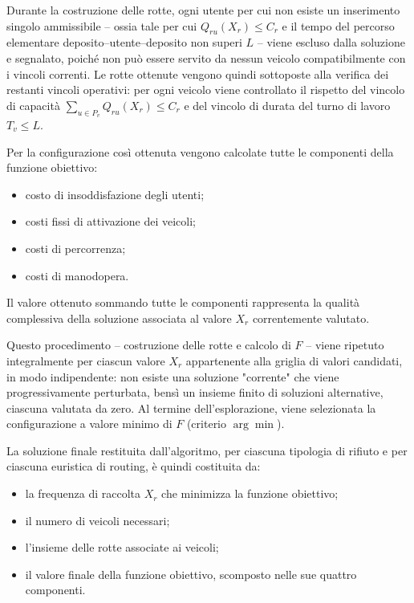 Durante la costruzione delle rotte, ogni utente per cui non esiste un inserimento singolo ammissibile -- ossia tale per cui $Q_{ru}(X_r) \leq C_r$ e il tempo del percorso elementare deposito--utente--deposito non superi $L$ -- viene escluso dalla soluzione e segnalato, poiché non può essere servito da nessun veicolo compatibilmente con i vincoli correnti. Le rotte ottenute vengono quindi sottoposte alla verifica dei restanti vincoli operativi: per ogni veicolo viene controllato il rispetto del vincolo di capacità $\sum_{u \in P_v} Q_{ru}(X_r) \leq C_r$ e del vincolo di durata del turno di lavoro $T_v \leq L$.

Per la configurazione così ottenuta vengono calcolate tutte le componenti della funzione obiettivo:

\begin{itemize}
	\item costo di insoddisfazione degli utenti;
	\item costi fissi di attivazione dei veicoli;
	\item costi di percorrenza;
	\item costi di manodopera.
\end{itemize}

\noindent
Il valore ottenuto sommando tutte le componenti rappresenta la qualità complessiva della soluzione associata al valore $X_r$ correntemente valutato.

Questo procedimento -- costruzione delle rotte e calcolo di $F$ -- viene ripetuto integralmente per ciascun valore $X_r$ appartenente alla griglia di valori candidati, in modo indipendente: non esiste una soluzione "corrente" che viene progressivamente perturbata, bensì un insieme finito di soluzioni alternative, ciascuna valutata da zero. Al termine dell'esplorazione, viene selezionata la configurazione a valore minimo di $F$ (criterio $\arg\min$).

La soluzione finale restituita dall'algoritmo, per ciascuna tipologia di rifiuto e per ciascuna euristica di routing, è quindi costituita da:

\begin{itemize}
	\item la frequenza di raccolta $X_r$ che minimizza la funzione obiettivo;
	\item il numero di veicoli necessari;
	\item l'insieme delle rotte associate ai veicoli;
	\item il valore finale della funzione obiettivo, scomposto nelle sue quattro componenti.
\end{itemize}

